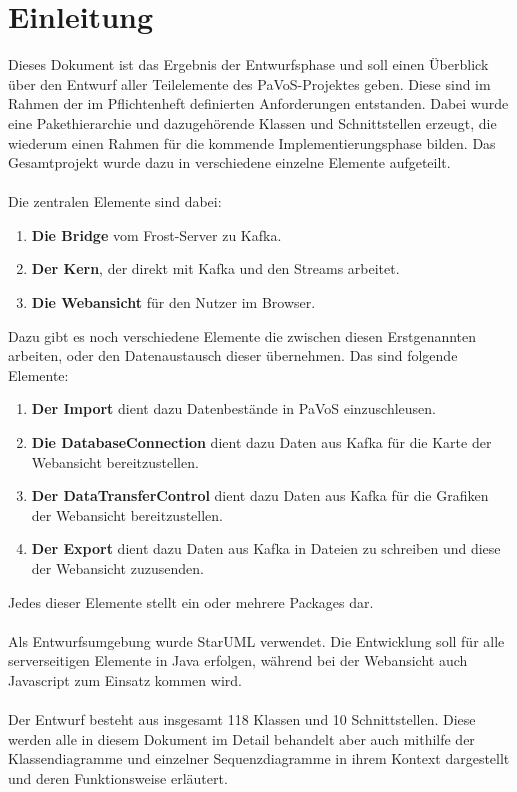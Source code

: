 \chapter{Einleitung}

Dieses Dokument ist das Ergebnis der Entwurfsphase und soll einen Überblick über den Entwurf aller Teilelemente des PaVoS-Projektes geben. Diese sind im Rahmen der im Pflichtenheft definierten Anforderungen entstanden. Dabei wurde eine Pakethierarchie und dazugehörende Klassen und Schnittstellen erzeugt, die wiederum einen Rahmen für die kommende Implementierungsphase bilden. Das Gesamtprojekt wurde dazu in verschiedene einzelne Elemente aufgeteilt.\\\\
Die zentralen Elemente sind dabei:
\begin{enumerate}
	\item \textbf{Die Bridge} vom Frost-Server zu Kafka.
	\item \textbf{Der Kern}, der direkt mit Kafka und den Streams arbeitet.
	\item \textbf{Die Webansicht} für den Nutzer im Browser.
\end{enumerate}
Dazu gibt es noch verschiedene Elemente die zwischen diesen Erstgenannten arbeiten, oder den Datenaustausch dieser übernehmen. Das sind folgende Elemente:
\begin{enumerate}
	\item \textbf{Der Import} dient dazu Datenbestände in PaVoS einzuschleusen.
	\item \textbf{Die DatabaseConnection} dient dazu Daten aus Kafka für die Karte der Webansicht bereitzustellen.
	\item \textbf{Der DataTransferControl} dient dazu Daten aus Kafka für die Grafiken der Webansicht bereitzustellen.
	\item \textbf{Der Export} dient dazu Daten aus Kafka in Dateien zu schreiben und diese der Webansicht zuzusenden.
\end{enumerate}
Jedes dieser Elemente stellt ein oder mehrere Packages dar.\\\\
Als Entwurfsumgebung wurde StarUML verwendet. Die Entwicklung soll für alle serverseitigen Elemente in Java erfolgen, während bei der Webansicht auch Javascript zum Einsatz kommen wird.\\\\
Der Entwurf besteht aus insgesamt 118 Klassen und 10 Schnittstellen. Diese werden alle in diesem Dokument im Detail behandelt aber auch mithilfe der Klassendiagramme und einzelner Sequenzdiagramme in ihrem Kontext dargestellt und deren Funktionsweise erläutert.
